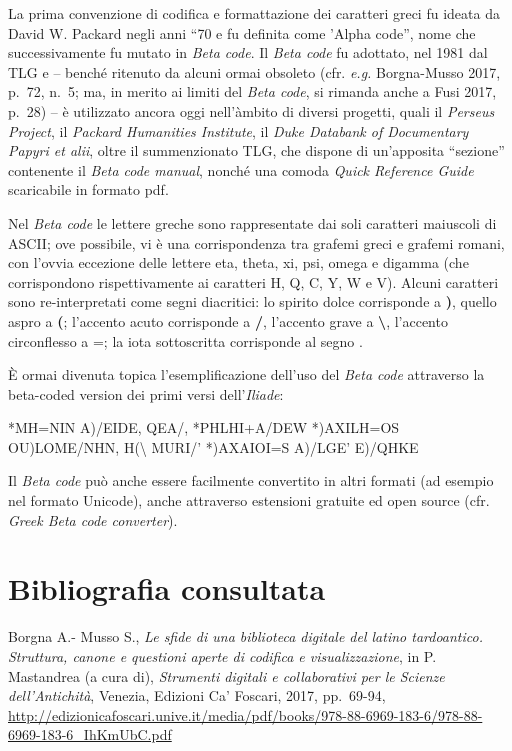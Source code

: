 \documentclass[
  b5paper,
  twoside,
  12pt,
  chapterprefix=false,
  bibliography=totocnumbered,
  parskip=false]{scrbook}
\begin{document}
La prima convenzione di codifica e formattazione dei caratteri greci fu
ideata da David W. Packard negli anni \enquote{70 e fu definita come 'Alpha
code}, nome che successivamente fu mutato in \emph{Beta code}. Il \emph{Beta code}
fu adottato, nel 1981 dal TLG e -- benché ritenuto da alcuni ormai
obsoleto (cfr. \emph{e.g.} Borgna-Musso 2017, p.~72, n.~5; ma, in merito ai
limiti del \emph{Beta code}, si rimanda anche a Fusi 2017, p.~28) -- è
utilizzato ancora oggi nell'àmbito di diversi progetti, quali il
\emph{Perseus Project}, il \emph{Packard Humanities Institute}, il \emph{Duke Databank
of Documentary Papyri et alii}, oltre il summenzionato TLG, che dispone
di un'apposita \enquote{sezione} contenente il \emph{Beta code manual}, nonché una
comoda \emph{Quick Reference Guide} scaricabile in formato pdf.

Nel \emph{Beta code} le lettere greche sono rappresentate dai soli caratteri
maiuscoli di ASCII; ove possibile, vi è una corrispondenza tra grafemi
greci e grafemi romani, con l'ovvia eccezione delle lettere eta, theta,
xi, psi, omega e digamma (che corrispondono rispettivamente ai caratteri
H, Q, C, Y, W e V). Alcuni caratteri sono re-interpretati come segni
diacritici: lo spirito dolce corrisponde a \textbf{)}, quello aspro a \textbf{(};
l'accento acuto corrisponde a \textbf{/}, l'accento grave a \textbf{\textbackslash{}}, l'accento
circonflesso a =; la iota sottoscritta corrisponde al segno \textbar.

È ormai divenuta topica l'esemplificazione dell'uso del \emph{Beta code}
attraverso la beta-coded version dei primi versi dell'\emph{Iliade}:

*MH=NIN A)/EIDE, QEA/, *PHLHI+A/DEW *)AXILH=OS\\
OU)LOME/NHN, H(\textbackslash{} MURI/' *)AXAIOI=S A)/LGE' E)/QHKE

Il \emph{Beta code} può anche essere facilmente convertito in altri formati
(ad esempio nel formato Unicode), anche attraverso estensioni gratuite
ed open source (cfr. \emph{Greek Beta code converter}).

\hypertarget{bibliografia-consultata-2}{%
\section*{Bibliografia consultata}\label{bibliografia-consultata-2}}

Borgna A.- Musso S., \emph{Le sfide di una biblioteca digitale del latino
tardoantico. Struttura, canone e questioni aperte di codifica e
visualizzazione}, in P. Mastandrea (a cura di), \emph{Strumenti digitali e
collaborativi per le Scienze dell'Antichità}, Venezia, Edizioni Ca'
Foscari, 2017, pp.~69-94,
\url{http://edizionicafoscari.unive.it/media/pdf/books/978-88-6969-183-6/978-88-6969-183-6_IhKmUbC.pdf}
\end{document}

